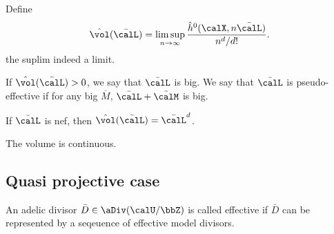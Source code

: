 Define
\[ \hat{\vol}(\bar{\calL}) = \limsup_{n \to \infty} \frac{\hat{h}^0(\calX,n\bar{\calL})}{n^d/d!}. \]
the suplim indeed a limit.

If $\hat{\vol}(\bar{\calL}) > 0$, we say that $\bar{\calL}$ is big.
We say that $\bar{\calL}$ is pseudo-effective if for any big $\overline{M}$, $\bar{\calL} + \bar{\calM}$ is big.

\begin{corollary}[label=\labelNFM{cor:I}, status=draft, tag=0000000]
	If $\bar{\calL}$ is nef, then $\hat{\vol}(\bar{\calL}) = \bar{\calL}^d$.

\end{corollary}

The volume is continuous.


\subsection[status=draft,tag=0000000,label=\labelNFM{subsec:quasi}]{Quasi projective case}

An adelic divisor $\bar{D} \in \aDiv(\calU/\bbZ)$ is called effective if $\bar{D}$ can be represented by a seqeuence of effective model divisors.













































